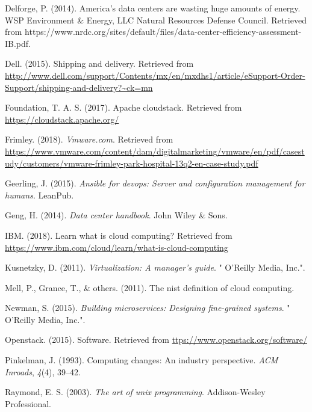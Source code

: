 \documentclass[12pt,twoside]{reedthesis}
\begin{document}
\leavevmode\hypertarget{ref-Cap1_2_PdP}{}%
Delforge, P. (2014). America's data centers are wasting huge amounts of energy. WSP Environment \& Energy, LLC Natural Resources Defense Council. Retrieved from https://www.nrdc.org/sites/default/files/data-center-efficiency-assessment-IB.pdf.

\leavevmode\hypertarget{ref-Cap1_3_PdP}{}%
Dell. (2015). Shipping and delivery. Retrieved from \url{http://www.dell.com/support/Contents/mx/en/mxdhs1/article/eSupport-Order-Support/shipping-and-delivery?~ck=mn}

\leavevmode\hypertarget{ref-Cap3_5_mT}{}%
Foundation, T. A. S. (2017). Apache cloudstack. Retrieved from \url{https://cloudstack.apache.org/}

\leavevmode\hypertarget{ref-Cap1_Hospital}{}%
Frimley. (2018). \emph{Vmware.com}. Retrieved from \url{https://www.vmware.com/content/dam/digitalmarketing/vmware/en/pdf/casestudy/customers/vmware-frimley-park-hospital-13q2-en-case-study.pdf}

\leavevmode\hypertarget{ref-Cap3_8mT}{}%
Geerling, J. (2015). \emph{Ansible for devops: Server and configuration management for humans}. LeanPub.

\leavevmode\hypertarget{ref-Cap1_5_PdP}{}%
Geng, H. (2014). \emph{Data center handbook}. John Wiley \& Sons.

\leavevmode\hypertarget{ref-ibmcloud}{}%
IBM. (2018). Learn what is cloud computing? Retrieved from \url{https://www.ibm.com/cloud/learn/what-is-cloud-computing}

\leavevmode\hypertarget{ref-Cap3_1_mT}{}%
Kusnetzky, D. (2011). \emph{Virtualization: A manager's guide}. " O'Reilly Media, Inc.".

\leavevmode\hypertarget{ref-Cap3_3_mT}{}%
Mell, P., Grance, T., \& others. (2011). The nist definition of cloud computing.

\leavevmode\hypertarget{ref-Cap3_Microservicios}{}%
Newman, S. (2015). \emph{Building microservices: Designing fine-grained systems}. " O'Reilly Media, Inc.".

\leavevmode\hypertarget{ref-Cap3_4_mT}{}%
Openstack. (2015). Software. Retrieved from \url{ttps://www.openstack.org/software/}

\leavevmode\hypertarget{ref-Cap1_ACMInroads}{}%
Pinkelman, J. (1993). Computing changes: An industry perspective. \emph{ACM Inroads}, \emph{4}(4), 39--42.

\leavevmode\hypertarget{ref-Cap3_ArtOfLinux}{}%
Raymond, E. S. (2003). \emph{The art of unix programming}. Addison-Wesley Professional.
\end{document}
